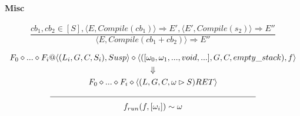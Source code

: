 \documentclass[]{article}
\numberwithin{equation}{section}
\numberwithin{figure}{section}
\numberwithin{table}{section}
\begin{document}
\paragraph{Misc}\label{misc}

\[\frac{cb_1, cb_2 \in [S], \langle E, Compile(cb_1) \rangle \Rightarrow E', \langle E', Compile(s_2) \rangle \Rightarrow E''}
       {\langle E, Compile(cb_1 + cb_2) \rangle \Rightarrow E''}\]

\begin{gather*} F_0 \diamond ... \diamond F_i @\langle(L_i, G, C, S_i) , Susp \rangle \diamond \langle ([\omega_0, \omega_1, ..., void, ...], G, C, empty\_stack) , f \rangle \\ \Downarrow \\ F_0 \diamond ... \diamond F_i \diamond \langle (L, G, C, \omega \rhd S) RET \rangle \\ \line(1,0){250} \\f_{run}(f, [\omega_i]) \sim \omega
\end{gather*}
\end{document}
